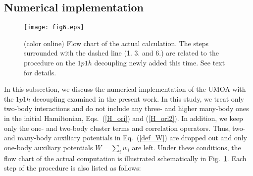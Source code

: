 \documentclass[aps,prc, dvips, twocolumn,groupedaddress,showkeys,showpacs,floatfix,superscriptaddress]{revtex4-1}
\newcommand{\<}{\langle}
\renewcommand{\>}{\rangle}
\begin{document}
\subsection{Numerical implementation \label{sec:cal}}

\begin{figure}[t]
\texttt{[image: fig6.eps]}
\caption{\label{flow_chart} (color online) Flow chart of the actual calculation.
The steps surrounded with the dashed line (1. 3. and 6.)
are related to the procedure on the $1p1h$ decoupling newly added this time.
See text for details.}
\end{figure}

In this subsection, we discuss the numerical implementation of the UMOA with the $1p1h$ decoupling examined in the present work.
In this study, we treat only two-body interactions and
do not include any three- and higher many-body ones in the initial Hamiltonian,
Eqs.~(\ref{H_ori}) and (\ref{H_ori2}).
In addition, we keep only the one- and two-body cluster terms and correlation operators.
Thus, two- and many-body auxiliary potentials in Eq.~(\ref{def_W})
 are dropped out and only one-body auxiliary potentials $W=\sum_{i}w_{i}$ are left.
Under these conditions, the flow chart of the actual computation is illustrated schematically in Fig.~\ref{flow_chart}.
Each step of the procedure is also listed as follows:
\end{document}
